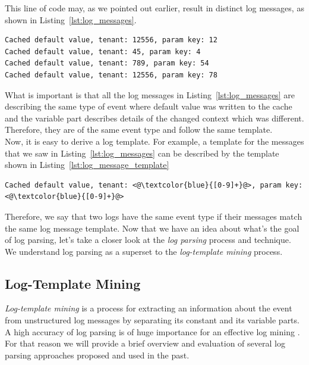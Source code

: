 This line of code may, as we pointed out earlier, result in distinct log messages, as shown in Listing~\ref{lst:log_messages}.\\

\begin{lstlisting}[label={lst:log_messages}, caption={Possible outputs of the code in Listing~\ref{lst:logging_code}}, captionpos=b]
Cached default value, tenant: 12556, param key: 12
Cached default value, tenant: 45, param key: 4
Cached default value, tenant: 789, param key: 54
Cached default value, tenant: 12556, param key: 78
\end{lstlisting}

What is important is that all the log messages in Listing~\ref{lst:log_messages} are describing the same type of event where default value was written to the cache and the variable part describes details of the changed context which was different. Therefore, they are of the same event type and follow the same template. \\

Now, it is easy to derive a log template. For example, a template for the messages that we saw in Listing~\ref{lst:log_messages} can be described by the template shown in Listing~\ref{lst:log_message_template}\\

\begin{lstlisting}[label={lst:log_message_template}, caption={Template for log messages in Listing ~\ref{lst:log_messages}, regular expressions are denoted in blue.}, captionpos=b]
Cached default value, tenant: <@\textcolor{blue}{[0-9]+}@>, param key: <@\textcolor{blue}{[0-9]+}@> 
\end{lstlisting}

Therefore, we say that two logs have the same event type if their messages match the same log message template. Now that we have an idea about what's the goal of log parsing, let's take a closer look at the \textit{log parsing} process and technique. We understand log parsing as a superset to the \textit{log-template mining} process. \\

\subsection{Log-Template Mining}\label{log_template_mining}

\textit{Log-template mining} is a process for extracting an information about the event from unstructured log messages by separating its constant and its variable parts. A high accuracy of log parsing is of huge importance for an effective log mining \cite{logParsingEvaluation2016}. For that reason we will provide a brief overview and evaluation of several log parsing approaches proposed and used in the past. \\
    
